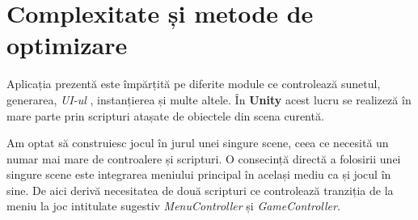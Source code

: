 \section{Complexitate și metode de optimizare}
Aplicația prezentă este împărțită pe diferite module ce controlează sunetul, generarea, \textit{UI-ul} , instanțierea și multe altele. În \textbf{Unity} acest lucru se realizeză în mare parte prin scripturi atașate de obiectele din scena curentă. \par
Am optat să construiesc jocul în jurul unei singure scene, ceea ce necesită un numar mai mare de controalere și scripturi. O consecință directă a folosirii unei singure scene este integrarea meniului principal în același mediu ca și jocul în sine. De aici derivă necesitatea de două scripturi ce controlează tranziția de la meniu la joc intitulate sugestiv \textit{MenuController} și \textit{GameController}.\par

